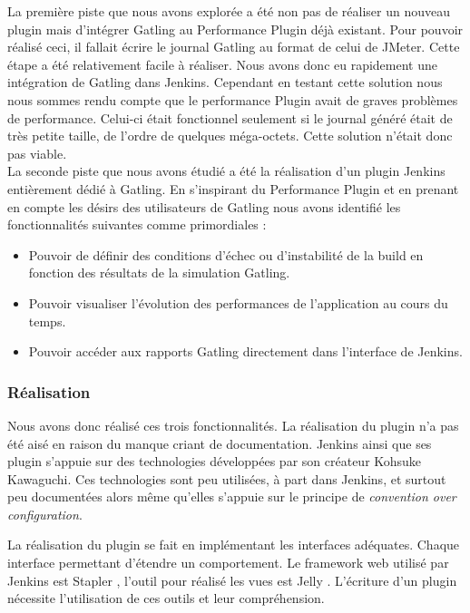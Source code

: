 La première piste que nous avons explorée a été non pas de réaliser un nouveau plugin mais d'intégrer Gatling au Performance Plugin déjà existant. Pour pouvoir réalisé ceci, il fallait écrire le journal Gatling au format de celui de JMeter. Cette étape a été relativement facile à réaliser. Nous avons donc eu rapidement une intégration de Gatling dans Jenkins. Cependant en testant cette solution nous nous sommes rendu compte que le performance Plugin avait de graves problèmes de performance. Celui-ci était fonctionnel seulement si le journal généré était de très petite taille, de l'ordre de quelques méga-octets. Cette solution n'était donc pas viable.\\

La seconde piste que nous avons étudié a été la réalisation d'un plugin Jenkins entièrement dédié à Gatling.
En s'inspirant du Performance Plugin et en prenant en compte les désirs des utilisateurs de Gatling nous avons identifié les fonctionnalités suivantes comme primordiales :

\begin{itemize}
	\item Pouvoir de définir des conditions d'échec ou d'instabilité de la build en fonction  des résultats de la simulation Gatling.
	\item Pouvoir visualiser l'évolution des performances de l'application au cours du temps.
	\item Pouvoir accéder aux rapports Gatling directement dans l'interface de Jenkins.
\end{itemize}

\subsubsection{Réalisation}

Nous avons donc réalisé ces trois fonctionnalités. La réalisation du plugin n'a pas été aisé en raison du manque criant de documentation. Jenkins ainsi que ses plugin s'appuie sur des technologies développées par son créateur  Kohsuke Kawaguchi. Ces technologies sont peu utilisées, à part dans Jenkins, et surtout peu documentées alors même qu'elles s'appuie sur le principe de \textit{convention over configuration}.

La réalisation du plugin se fait en implémentant les interfaces adéquates. Chaque interface permettant d'étendre un comportement. Le framework web utilisé par Jenkins est Stapler \cite{stapler}, l'outil pour réalisé les vues est Jelly \cite{jelly}. L'écriture d'un plugin nécessite l'utilisation de ces outils et leur compréhension.

